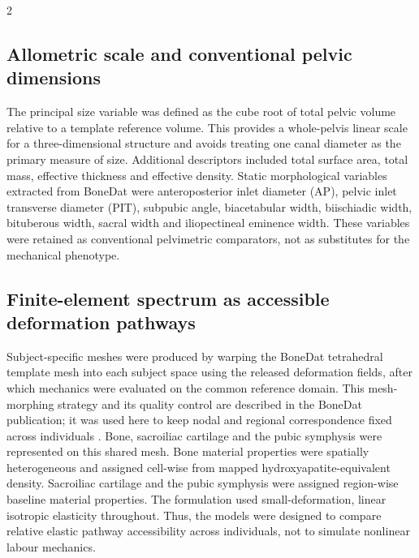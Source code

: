\documentclass[openacc]{rsproca_new}
\begin{document}
\begin{multicols}{2}
\subsection{Allometric scale and conventional pelvic dimensions}

The principal size variable was defined as the cube root of total pelvic volume relative to a template reference volume. This provides a whole-pelvis linear scale for a three-dimensional structure and avoids treating one canal diameter as the primary measure of size. Additional descriptors included total surface area, total mass, effective thickness and effective density. Static morphological variables extracted from BoneDat were anteroposterior inlet diameter (AP), pelvic inlet transverse diameter (PIT), subpubic angle, biacetabular width, biischiadic width, bituberous width, sacral width and iliopectineal eminence width. These variables were retained as conventional pelvimetric comparators, not as substitutes for the mechanical phenotype.

\subsection{Finite-element spectrum as accessible deformation pathways}

Subject-specific meshes were produced by warping the BoneDat tetrahedral template mesh into each subject space using the released deformation fields, after which mechanics were evaluated on the common reference domain. This mesh-morphing strategy and its quality control are described in the BoneDat publication; it was used here to keep nodal and regional correspondence fixed across individuals \cite{HenysKuchar2025}. Bone, sacroiliac cartilage and the pubic symphysis were represented on this shared mesh. Bone material properties were spatially heterogeneous and assigned cell-wise from mapped hydroxyapatite-equivalent density. Sacroiliac cartilage and the pubic symphysis were assigned region-wise baseline material properties. The formulation used small-deformation, linear isotropic elasticity throughout. Thus, the models were designed to compare relative elastic pathway accessibility across individuals, not to simulate nonlinear labour mechanics.


\end{multicols}
\end{document}
